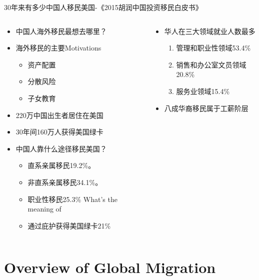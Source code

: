 \documentclass[10pt,hyperref={CJKbookmarks=true},xcolor=dvipsnames,aspectratio=169]{beamer}
\begin{document}
\begin{frame}{30年来有多少中国人移民美国-《2015胡润中国投资移民白皮书》}

\begin{columns}[onlytextwidth]
	\begin{column}{0.5\textwidth}
		\begin{itemize}
				\item  中国人海外移民最想去哪里？ 
		\item 海外移民的主要Motivations
		\begin{itemize}
			\item 资产配置
			\item 分散风险
			\item 子女教育
		\end{itemize} 
		\item 220万中国出生者居住在美国
		\item 30年间160万人获得美国绿卡
		\item 中国人靠什么途径移民美国？
		  \begin{itemize}
		  	\item 直系亲属移民19.2\%。
		  	\item 非直系亲属移民34.1\%。
		  	\item 职业性移民25.3\% What's the meaning of 
		  	\item 通过庇护获得美国绿卡21\%
		  \end{itemize}	
		\end{itemize}
	\end{column}
	\begin{column}{0.5\textwidth}
		\begin{itemize}
			\item 华人在三大领域就业人数最多
			 \begin{enumerate}
			 	\item 管理和职业性领域53.4\%
			 	\item 销售和办公室文员领域20.8\%
			 	\item 服务业领域15.4\%
			 \end{enumerate}
		 \item 八成华裔移民属于工薪阶层
		\end{itemize}
	\end{column}
\end{columns}



\end{frame}

\section{Overview of Global Migration}
\end{document}
